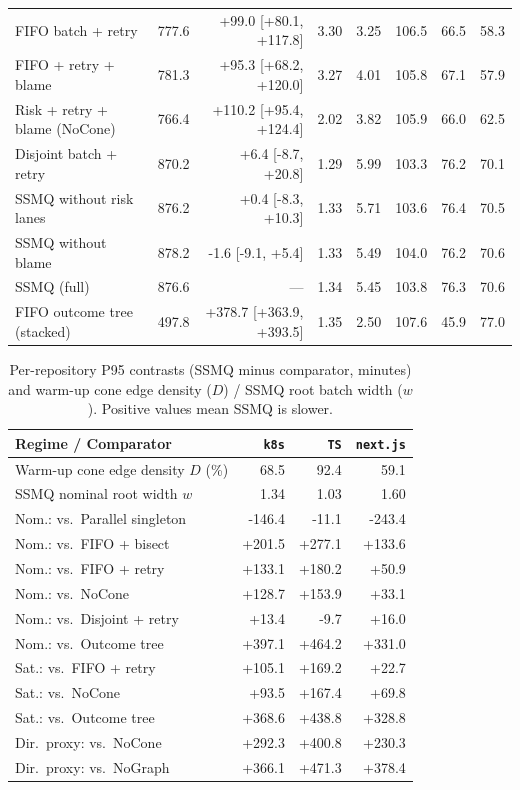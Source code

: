 \begin{table}[t]
\begin{tabular}{lrrrrrrr}
FIFO batch + retry & 777.6 & +99.0 [+80.1, +117.8] & 3.30 & 3.25 & 106.5 & 66.5 & 58.3 \\
FIFO + retry + blame & 781.3 & +95.3 [+68.2, +120.0] & 3.27 & 4.01 & 105.8 & 67.1 & 57.9 \\
Risk + retry + blame (NoCone) & 766.4 & +110.2 [+95.4, +124.4] & 2.02 & 3.82 & 105.9 & 66.0 & 62.5 \\
Disjoint batch + retry & 870.2 & +6.4 [-8.7, +20.8] & 1.29 & 5.99 & 103.3 & 76.2 & 70.1 \\
SSMQ without risk lanes & 876.2 & +0.4 [-8.3, +10.3] & 1.33 & 5.71 & 103.6 & 76.4 & 70.5 \\
SSMQ without blame & 878.2 & -1.6 [-9.1, +5.4] & 1.33 & 5.49 & 104.0 & 76.2 & 70.6 \\
SSMQ (full) & 876.6 & --- & 1.34 & 5.45 & 103.8 & 76.3 & 70.6 \\
FIFO outcome tree (stacked) & 497.8 & +378.7 [+363.9, +393.5] & 1.35 & 2.50 & 107.6 & 45.9 & 77.0 \\
\bottomrule\end{tabular}\end{table}
\begin{table}[t]\centering\scriptsize
\caption{Per-repository P95 contrasts (SSMQ minus comparator, minutes) and warm-up cone edge density ($D$) / SSMQ root batch width ($w$). Positive values mean SSMQ is slower.}\label{tab:v7perrepo}
\setlength{\tabcolsep}{3.5pt}
\begin{tabular}{lrrr}\toprule
Regime / Comparator & \texttt{k8s} & \texttt{TS} & \texttt{next.js} \\ \midrule
Warm-up cone edge density $D$ (\%) & 68.5 & 92.4 & 59.1 \\
SSMQ nominal root width $w$ & 1.34 & 1.03 & 1.60 \\ \midrule
Nom.: vs.\ Parallel singleton & -146.4 & -11.1 & -243.4 \\
Nom.: vs.\ FIFO + bisect & +201.5 & +277.1 & +133.6 \\
Nom.: vs.\ FIFO + retry & +133.1 & +180.2 & +50.9 \\
Nom.: vs.\ NoCone & +128.7 & +153.9 & +33.1 \\
Nom.: vs.\ Disjoint + retry & +13.4 & -9.7 & +16.0 \\
Nom.: vs.\ Outcome tree & +397.1 & +464.2 & +331.0 \\
Sat.: vs.\ FIFO + retry & +105.1 & +169.2 & +22.7 \\
Sat.: vs.\ NoCone & +93.5 & +167.4 & +69.8 \\
Sat.: vs.\ Outcome tree & +368.6 & +438.8 & +328.8 \\
Dir.\ proxy: vs.\ NoCone & +292.3 & +400.8 & +230.3 \\
Dir.\ proxy: vs.\ NoGraph & +366.1 & +471.3 & +378.4 \\
\bottomrule\end{tabular}\end{table}
